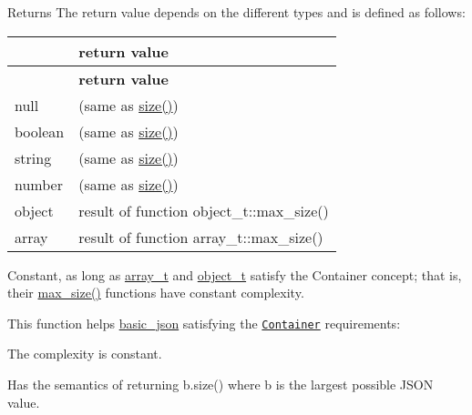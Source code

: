 \begin{DoxyReturn}{Returns}
The return value depends on the different types and is defined as follows\+: \tabulinesep=1mm
\begin{longtabu} spread 0pt [c]{*{2}{|X[-1]}|}
\hline
{}&{\bf return value  }\\
\endfirsthead
\hline
\endfoot
\hline
{}&{\bf return value  }\\
\endhead
null &{} (same as {\ttfamily \hyperlink{classnlohmann_1_1basic__json_a0ea8a1ecca4b3cb0ba09ad7552c364b6}{size()}}) \\
boolean &{} (same as {\ttfamily \hyperlink{classnlohmann_1_1basic__json_a0ea8a1ecca4b3cb0ba09ad7552c364b6}{size()}}) \\
string &{} (same as {\ttfamily \hyperlink{classnlohmann_1_1basic__json_a0ea8a1ecca4b3cb0ba09ad7552c364b6}{size()}}) \\
number &{} (same as {\ttfamily \hyperlink{classnlohmann_1_1basic__json_a0ea8a1ecca4b3cb0ba09ad7552c364b6}{size()}}) \\
object &result of function {\ttfamily object\+\_\+t\+::max\+\_\+size()} \\
array &result of function {\ttfamily array\+\_\+t\+::max\+\_\+size()} \\
\end{longtabu}
Constant, as long as \hyperlink{classnlohmann_1_1basic__json_ab00b882d39306d663c23dab110f5cae0}{array\+\_\+t} and \hyperlink{classnlohmann_1_1basic__json_a0ac9894c9de8dc551cf2e5f1c605537f}{object\+\_\+t} satisfy the Container concept; that is, their {\ttfamily \hyperlink{classnlohmann_1_1basic__json_a7936417b875b7ec737f77ef84bbf7871}{max\+\_\+size()}} functions have constant complexity.
\end{DoxyReturn}
This function helps {\ttfamily \hyperlink{classnlohmann_1_1basic__json}{basic\+\_\+json}} satisfying the \href{http://en.cppreference.com/w/cpp/concept/Container}{\tt Container} requirements\+:
\begin{DoxyItemize}
\item The complexity is constant.
\item Has the semantics of returning {\ttfamily b.\+size()} where {\ttfamily b} is the largest possible J\+S\+ON value.
\end{DoxyItemize}

